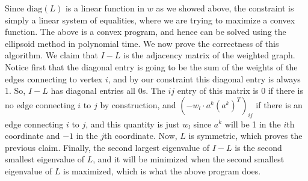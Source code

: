 \documentclass[12pt]{article}
\theoremstyle{definitionstyle}
\begin{document}
\begin{enumerate}[leftmargin=\labelsep]
		Since $\mathrm{diag}(L)$ is a linear function in $w$ as we showed above, the constraint is simply a linear system of equalities, where we are trying to maximize a convex function. The above is a convex program, and hence can be solved using the ellipsoid method in polynomial time. We now prove the correctness of this algorithm. We claim that $I - L$ is the adjacency matrix of the weighted graph. Notice first that the diagonal entry is going to be the sum of the weights of the edges connecting to vertex $i$, and by our constraint this diagonal entry is always 1. So, $I-L$ has diagonal entries all 0s. The $ij$ entry of this matrix is 0 if there is no edge connecting $i$ to $j$ by construction, and $(-w_l \cdot a^k(a^k)^T)_{ij}$ if there is an edge connecting $i$ to $j$, and this quantity is just $w_l$ since $a^k$ will be 1 in the $i$th coordinate and $-1$ in the $j$th coordinate. Now, $L$ is symmetric, which proves the previous claim. Finally, the second largest eigenvalue of $I-L$ is the second smallest eigenvalue of $L$, and it will be minimized when the second smallest eigenvalue of $L$ is maximized, which is what the above program does.
	\end{enumerate}
\end{document}
